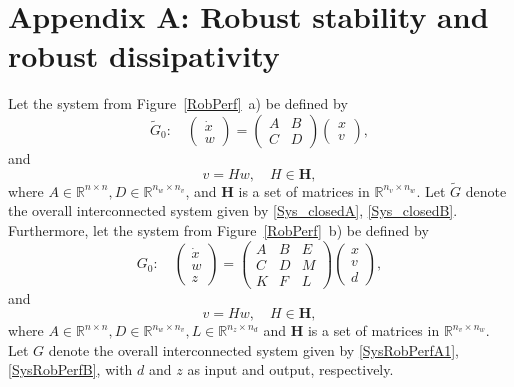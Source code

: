 \documentclass[11pt,a4paper,oneside,DIV=12,headings=small]{scrartcl}
\newcommand{\Rset}{\mathbb{R}}
\theoremstyle{plain}
\begin{document}
\section*{Appendix A: Robust stability and robust dissipativity}
\label{Appendix_A}
Let the system from Figure~\ref{RobPerf}~a) be defined by
\begin{equation}
\label{Sys_closedA}
\tilde{G}_0: \quad \begin{pmatrix}\dot{x} \\ w  \end{pmatrix} 
=
\begin{pmatrix} A & B  \\ C & D  \end{pmatrix}
\begin{pmatrix} x \\ v \end{pmatrix},
\end{equation}
and
\begin{equation}
\label{Sys_closedB}
v  = H w, \quad H\in \mathbf{H},
\end{equation}
where $A \in \Rset^{n\times n}, D\in \Rset^{n_w \times n_v}$, and $\mathbf{H}$ is a set of matrices in $\Rset^{n_v \times n_w}$. Let $\tilde{G}$ denote the overall interconnected system given by \eqref{Sys_closedA}, \eqref{Sys_closedB}. Furthermore, let the system from Figure~\ref{RobPerf}~b) be defined by
\begin{equation}
\label{SysRobPerfA1}
G_0: \quad \begin{pmatrix}\dot{x} \\ w \\ z \end{pmatrix} 
=
\begin{pmatrix} A & B & E \\ C & D & M \\ K & F & L\end{pmatrix}
\begin{pmatrix} x \\ v \\ d \end{pmatrix},
\end{equation}
and
\begin{equation}
\label{SysRobPerfB}
v  = H w, \quad H\in \mathbf{H},
\end{equation}
where $A \in \Rset^{n\times n}, D\in \Rset^{n_w \times n_v}, L \in \Rset^{n_z \times n_d}$ and $\mathbf{H}$ is a set of matrices in $\Rset^{n_v \times n_w}$. Let $G$ denote the overall interconnected system given by \eqref{SysRobPerfA1}, \eqref{SysRobPerfB}, with $d$ and $z$ as input and output, respectively.
\end{document}
